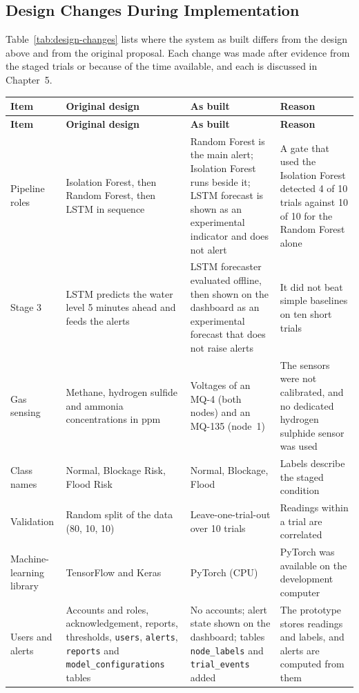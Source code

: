 \documentclass[12pt, a4paper]{article}
\begin{document}
\subsection{Design Changes During Implementation}
\label{sec:design-changes}

Table~\ref{tab:design-changes} lists where the system as built differs from the design above and from the original proposal. Each change was made after evidence from the staged trials or because of the time available, and each is discussed in Chapter~5.

\begin{longtable}{|p{2.8cm}|p{3.6cm}|p{3.7cm}|p{3.0cm}|}
\hline
\textbf{Item} & \textbf{Original design} & \textbf{As built} & \textbf{Reason} \\
\hline
\endfirsthead
\hline
\textbf{Item} & \textbf{Original design} & \textbf{As built} & \textbf{Reason} \\
\hline
\endhead
Pipeline roles & Isolation Forest, then Random Forest, then LSTM in sequence & Random Forest is the main alert; Isolation Forest runs beside it; LSTM forecast is shown as an experimental indicator and does not alert & A gate that used the Isolation Forest detected 4 of 10 trials against 10 of 10 for the Random Forest alone \\
\hline
Stage 3 & LSTM predicts the water level 5 minutes ahead and feeds the alerts & LSTM forecaster evaluated offline, then shown on the dashboard as an experimental forecast that does not raise alerts & It did not beat simple baselines on ten short trials \\
\hline
Gas sensing & Methane, hydrogen sulfide and ammonia concentrations in ppm & Voltages of an MQ-4 (both nodes) and an MQ-135 (node~1) & The sensors were not calibrated, and no dedicated hydrogen sulphide sensor was used \\
\hline
Class names & Normal, Blockage Risk, Flood Risk & Normal, Blockage, Flood & Labels describe the staged condition \\
\hline
Validation & Random split of the data (80, 10, 10) & Leave-one-trial-out over 10 trials & Readings within a trial are correlated \\
\hline
Machine-learning library & TensorFlow and Keras & PyTorch (CPU) & PyTorch was available on the development computer \\
\hline
Users and alerts & Accounts and roles, acknowledgement, reports, thresholds, \texttt{users}, \texttt{alerts}, \texttt{reports} and \texttt{model\_configurations} tables & No accounts; alert state shown on the dashboard; tables \texttt{node\_labels} and \texttt{trial\_events} added & The prototype stores readings and labels, and alerts are computed from them \\

\end{longtable}
\end{document}
